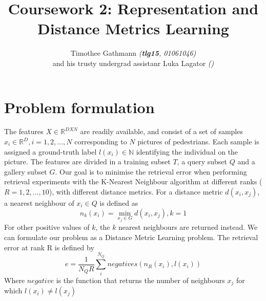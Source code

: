 \documentclass[10pt,technote]{IEEEtran}
\title{Coursework 2: Representation and Distance Metrics Learning }
\author{Timothee Gathmann \textit{(\textbf{tlg15}, 01061046)}\\ and his trusty undergrad assistanr Luka Lagator\textit{ ()}}
\begin{document}
\maketitle

\section{Problem formulation}
The features $X \in \mathbb{R}^{D X N}$ are readily available, and consist of a set of samples $x_i \in \mathbb{R}^D, i = 1, 2, ..., N$ corresponding to $N$ pictures of pedestrians. Each sample is assigned a ground-truth label $l(x_i) \in \mathbb{N}$ identifying the individual on the picture. The features are divided in a training subset $T$, a query subset $Q$ and a gallery subset $G$. Our goal is to minimise the retrieval error when performing retrieval experiments with the K-Nearest Neighbour algorithm \cite{Cover1967} at different ranks ($R = 1, 2, ..., 10 $), with different distance metrics. For a distance metric $d(x_i, x_j)$, a nearest neighbour of $x_i \in Q$ is defined as
\begin{equation}
n_k(x_i) = \min_{x_j \in G}  d(x_i, x_j), k = 1
\end{equation}
For other positive values of $k$, the $k$ nearest neighbours are returned instead.
We can formulate our problem as a Distance Metric Learning problem. The retrieval error at rank R is defined by
\begin{equation}
e = \frac{1}{N_Q R}\sum^{N_Q}_{i} negatives(n_R(x_i), l(x_i)) 
\end{equation}
Where $negative$ is the function that returns the number of neighbours $x_j$ for which $l(x_i) \neq l(x_j)$






\end{document}
